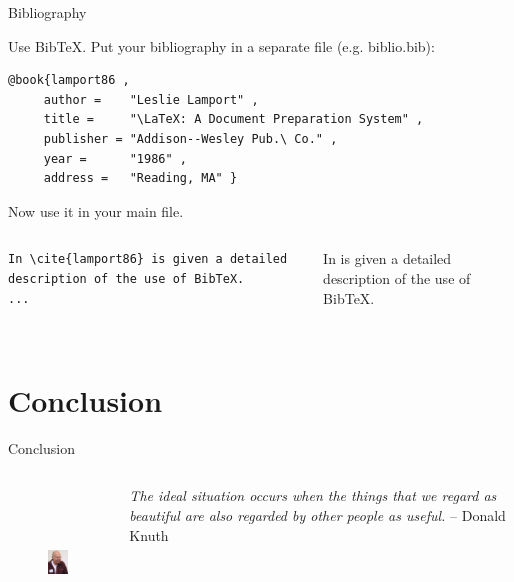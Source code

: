 \documentclass{beamer}
\begin{document}
\begin{frame}[fragile]{Bibliography}

Use BibTeX. Put your bibliography in a separate file (e.g. biblio.bib): 
\begin{lstlisting}
@book{lamport86 ,
     author =    "Leslie Lamport" ,
     title =     "\LaTeX: A Document Preparation System" ,
     publisher = "Addison--Wesley Pub.\ Co." ,
     year =      "1986" ,
     address =   "Reading, MA" }
\end{lstlisting}
Now use it in your main file.
\begin{columns}
\begin{column}{5cm}
\begin{lstlisting}
In \cite{lamport86} is given a detailed description of the use of BibTeX.
...


\end{lstlisting}
\end{column}
\begin{column}{5cm}
In \cite{lamport86} is given a detailed description of the use of BibTeX.
\end{column}
\end{columns}


\end{frame}

\section{Conclusion}
	
    \begin{frame}{Conclusion}
		\begin{columns}
			\begin{column}{5cm}
				\begin{figure}
   					\includegraphics[height=4cm]{384px-KnuthAtOpenContentAlliance.jpg}
				\end{figure}
			\end{column}
			\begin{column}{5cm}
				\begin{flushright}
					\textit{The ideal situation occurs when
the things that we regard as beautiful
are also regarded by other
people as useful.}
					\vskip 0.5cm
				-- Donald Knuth
				\end{flushright}
			\end{column}
		\end{columns}
	\end{frame}
\end{document}
